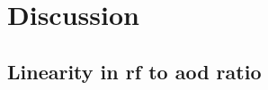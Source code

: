 \documentclass{ametsocV5}
\begin{document}


\section{Discussion}%


\subsection{Linearity in \ac{rf} to \ac{aod} ratio}
\end{document}
